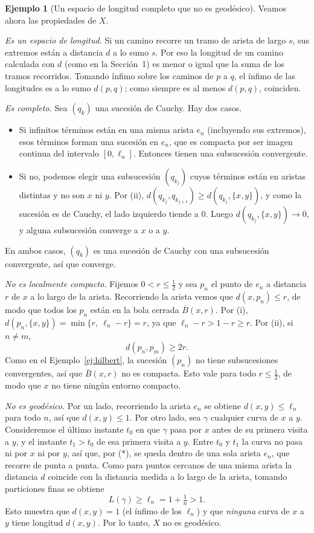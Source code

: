 \documentclass[12pt, a4paper]{amsart}
\theoremstyle{definition}
\newtheorem{ejemplo}[teorema]{Ejemplo}
\theoremstyle{remark}
\newcommand{\Bc}{\overline{B}}
\begin{document}
\begin{ejemplo}[Un espacio de longitud completo que no es geodésico]
Veamos ahora las propiedades de $X$.

\emph{Es un espacio de longitud.} Si un camino recorre un tramo de arista de largo $s$, sus extremos están a distancia $d$ a lo sumo $s$. Por eso la longitud de un camino calculada con $d$ (como en la Sección~1) es menor o igual que la suma de los tramos recorridos. Tomando ínfimo sobre los caminos de $p$ a $q$, el ínfimo de las longitudes es a lo sumo $d(p,q)$; como siempre es al menos $d(p,q)$, coinciden.

\emph{Es completo.} Sea $(q_k)$ una sucesión de Cauchy. Hay dos casos.
\begin{itemize}
\item Si infinitos términos están en una misma arista $e_n$ (incluyendo sus extremos), esos términos forman una sucesión en $e_n$, que es compacta por ser imagen continua del intervalo $[0,\ell_n]$. Entonces tienen una subsucesión convergente.
\item Si no, podemos elegir una subsucesión $(q_{k_j})$ cuyos términos están en aristas distintas y no son $x$ ni $y$. Por (ii), $d(q_{k_j},q_{k_{j+1}})\ge d(q_{k_j},\{x,y\})$, y como la sucesión es de Cauchy, el lado izquierdo tiende a $0$. Luego $d(q_{k_j},\{x,y\})\to0$, y alguna subsucesión converge a $x$ o a $y$.
\end{itemize}
En ambos casos, $(q_k)$ es una sucesión de Cauchy con una subsucesión convergente, así que converge.

\emph{No es localmente compacto.} Fijemos $0<r\le\frac12$ y sea $p_n$ el punto de $e_n$ a distancia $r$ de $x$ a lo largo de la arista. Recorriendo la arista vemos que $d(x,p_n)\le r$, de modo que todos los $p_n$ están en la bola cerrada $\Bc(x,r)$. Por (i), $d(p_n,\{x,y\})=\min\{r,\ \ell_n-r\}=r$, ya que $\ell_n-r>1-r\ge r$. Por (ii), si $n\ne m$,
\[
d(p_n,p_m)\ge 2r.
\]
Como en el Ejemplo~\ref{ej:hilbert}, la sucesión $(p_n)$ no tiene subsucesiones convergentes, así que $\Bc(x,r)$ no es compacta. Esto vale para todo $r\le\frac12$, de modo que $x$ no tiene ningún entorno compacto.

\emph{No es geodésico.} Por un lado, recorriendo la arista $e_n$ se obtiene $d(x,y)\le\ell_n$ para todo $n$, así que $d(x,y)\le1$. Por otro lado, sea $\gamma$ cualquier curva de $x$ a $y$. Consideremos el último instante $t_0$ en que $\gamma$ pasa por $x$ antes de su primera visita a $y$, y el instante $t_1>t_0$ de esa primera visita a $y$. Entre $t_0$ y $t_1$ la curva no pasa ni por $x$ ni por $y$, así que, por ($\ast$), se queda dentro de una sola arista $e_n$, que recorre de punta a punta. Como para puntos cercanos de una misma arista la distancia $d$ coincide con la distancia medida a lo largo de la arista, tomando particiones finas se obtiene
\[
L(\gamma)\ge\ell_n=1+\tfrac1n>1.
\]
Esto muestra que $d(x,y)=1$ (el ínfimo de los $\ell_n$) y que \emph{ninguna} curva de $x$ a $y$ tiene longitud $d(x,y)$. Por lo tanto, $X$ no es geodésico.
\end{ejemplo}
\end{document}
